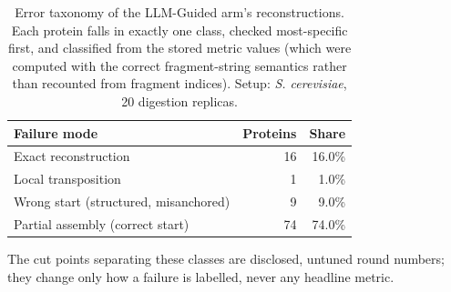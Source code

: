 \begin{table}[!tb]
  \centering
  \caption{Error taxonomy of the LLM-Guided arm's reconstructions. Each protein falls in exactly one class, checked most-specific first, and classified from the stored metric values (which were computed with the correct fragment-string semantics rather than recounted from fragment indices). Setup: \textnormal{\textnormal{\textit{S. cerevisiae}}}, 20 digestion replicas.}
  \label{tab:error_taxonomy_yeast_r20}
  \begin{tabular}{lrr}
    \toprule
    Failure mode & Proteins & Share \\
    \midrule
    Exact reconstruction & 16 & 16.0\% \\
    Local transposition & 1 & 1.0\% \\
    Wrong start (structured, misanchored) & 9 & 9.0\% \\
    Partial assembly (correct start) & 74 & 74.0\% \\
    \bottomrule
  \end{tabular}
  \par\smallskip\footnotesize{The cut points separating these classes are disclosed, untuned round numbers; they change only how a failure is labelled, never any headline metric.}
\end{table}
